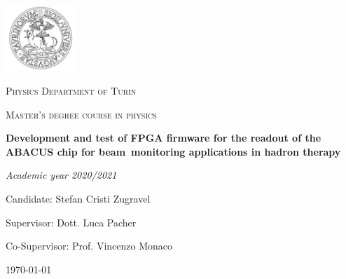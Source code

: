 \documentclass[a4paper]{report}
\begin{document}
	
	\begin{titlepage}
		\centering
		\includegraphics[width=0.2\textwidth]{img/logo_unito.JPG}\par
		\vspace{1cm}
		{\scshape\LARGE Physics Department of Turin \par}
		{\scshape\LARGE Master's degree course in physics \par}
		\vspace{4cm}
		{\Huge \textbf{Development and test of FPGA firmware for the readout of the ABACUS chip for beam~monitoring applications in hadron therapy} \par}	
		\vspace{3cm}
		{\Large\itshape Academic year 2020/2021\par}
		\vspace{1cm}
		{\large Candidate: Stefan Cristi Zugravel \par} 
		{\large Supervisor: Dott. Luca Pacher \par}
		{\large Co-Supervisor: Prof. Vincenzo Monaco \par}
		
		\vfill
		
		{\large \today\par}
	\end{titlepage}
	
	\tableofcontents
	
	
	
\end{document}
